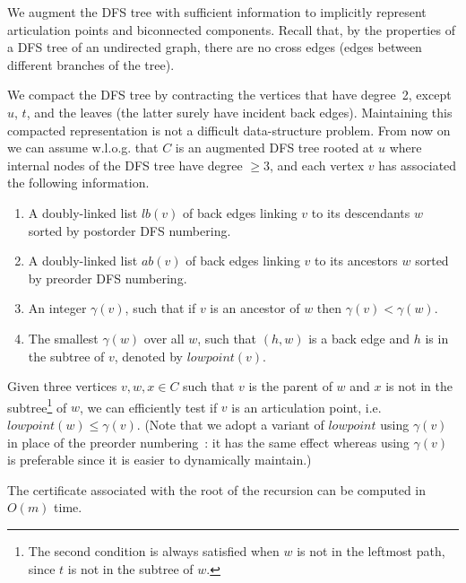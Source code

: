 We augment the DFS tree with sufficient information to implicitly
represent articulation points and biconnected components.  
Recall that, by the properties of a DFS tree of an undirected graph,
there are no cross edges (edges between different branches of the
tree).

We compact the DFS tree by contracting the vertices that have
degree~2, except $u$, $t$, and the leaves (the latter surely have
incident back edges). Maintaining this compacted representation is not
a difficult data-structure problem. From now on we can assume
w.l.o.g.\mbox{} that $C$ is an augmented DFS tree rooted at $u$ where
internal nodes of the DFS tree have degree $\ge 3$, and each vertex
$v$ has associated the following information.

\begin{enumerate}
	\setlength{\itemsep}{0pt} 
	\item A doubly-linked list $lb(v)$ of back edges linking $v$
          to its descendants $w$ sorted by postorder DFS numbering.
	\item A doubly-linked list $ab(v)$ of back edges linking $v$
          to its ancestors $w$ sorted by preorder DFS numbering.
        \item \label{item:point3} An integer $\gamma(v)$, such that if $v$ is an
                ancestor of $w$ then $\gamma(v) < \gamma(w)$.
	\item \label{item:point4} The smallest $\gamma(w)$ over all
          $w$, such that $(h,w)$ is a back edge and $h$ is in the
          subtree of $v$, denoted by $\mathit{lowpoint}(v)$.
\end{enumerate}

Given three vertices $v,w,x \in C$ such that $v$ is the parent of $w$
and $x$ is not in the subtree\footnote{The second condition is always
  satisfied when $w$ is not in the leftmost path, since $t$ is not in
  the subtree of $w$.} of $w$, we can efficiently test if $v$ is an
articulation point, i.e.\mbox{} $\mathit{lowpoint}(w) \leq
\gamma(v)$. (Note that we adopt a variant of $\mathit{lowpoint}$ using
$\gamma(v)$ in place of the preorder numbering~\cite{Tarjan72}: it has
the same effect whereas using $\gamma(v)$ is preferable since it is
easier to dynamically maintain.)

\begin{lemma}
  \label{lem:certificate_scratch}
 The certificate associated with the root of the recursion can be
 computed in $O(m)$ time.
\end{lemma}


